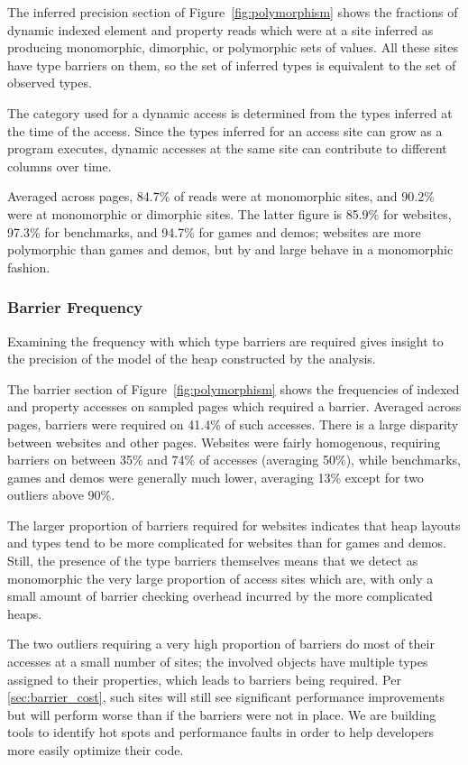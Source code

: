 The inferred precision section of Figure~\ref{fig:polymorphism} shows the fractions
of dynamic indexed element and property reads which were at a site inferred
as producing
monomorphic, dimorphic, or polymorphic sets of values.
All these sites have type barriers on them, so the set of inferred types
is equivalent to the set of observed types.

The category used for a dynamic access is determined from the types
inferred at the time of the access.
Since the types inferred for an access site can grow as a program executes,
dynamic accesses at the same site can contribute to different
columns over time.

Averaged across pages, 84.7\% of reads were at monomorphic
sites, and 90.2\% were at monomorphic or dimorphic sites.
The latter figure is 85.9\% for websites, 97.3\% for benchmarks,
and 94.7\% for games and demos; websites are more polymorphic than games
and demos, but by and large behave in a monomorphic fashion.

\subsubsection{Barrier Frequency}
\label{sec:barriers}

Examining the frequency with which type barriers are required
gives insight to the precision of the model of the heap constructed by
the analysis.

The barrier section of Figure~\ref{fig:polymorphism} shows the frequencies of
indexed and property accesses on sampled pages which required a barrier.
Averaged across pages, barriers were required on 41.4\% of such accesses.
There is a large disparity between websites and other pages.
Websites were fairly homogenous, requiring barriers on between 35\%
and 74\% of accesses (averaging 50\%), while benchmarks,
games and demos were generally
much lower, averaging 13\% except for two outliers above 90\%.

The larger proportion of barriers required for websites indicates that
heap layouts and types tend to be more complicated for websites than for
games and demos.
Still, the presence of the type barriers themselves means that we
detect as monomorphic the very large proportion of access sites which are,
with only a small amount of barrier checking overhead incurred by the
more complicated heaps.

The two outliers requiring a very high proportion of barriers do most of
their accesses at a small number of sites; the involved objects have
multiple types assigned to their properties, which leads to barriers being
required.
Per \Section\ref{sec:barrier_cost}, such sites will still see significant
performance improvements but will perform worse than if the barriers were
not in place.
We are building tools to identify hot spots and performance
faults in order to help developers more easily optimize their code.

